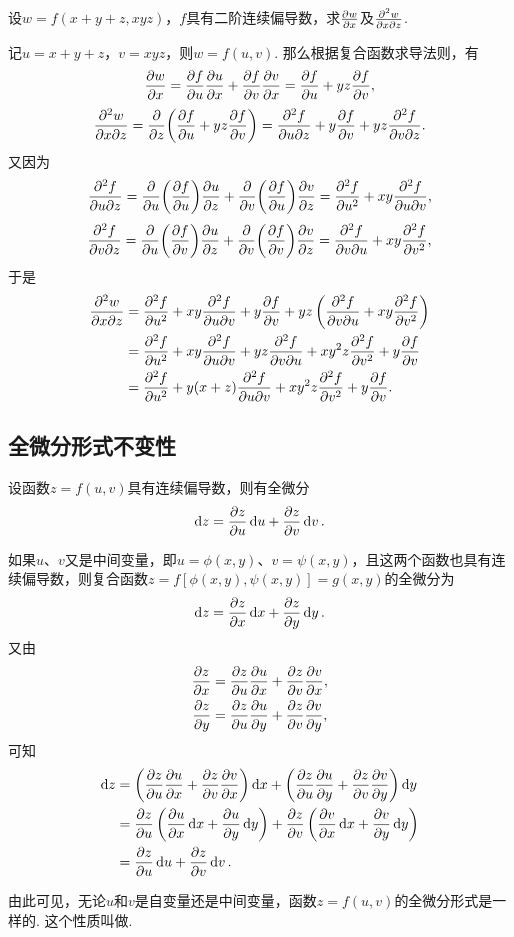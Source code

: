 \begin{example}
设\(w = f(x+y+z,xyz)\)，\(f\)具有二阶连续偏导数，求\(\pdv{w}{x}\)及\(\pdv[2]{w}{x}{z}\).
\begin{solution}
记\(u = x+y+z\)，\(v = xyz\)，则\(w = f(u,v)\).
那么根据复合函数求导法则，有\[
\pdv{w}{x} = \pdv{f}{u} \pdv{u}{x} + \pdv{f}{v} \pdv{v}{x}
= \pdv{f}{u} + yz \pdv{f}{v},
\]\[
\pdv[2]{w}{x}{z} = \pdv{z}(\pdv{f}{u} + yz \pdv{f}{v})
= \pdv[2]{f}{u}{z} + y\pdv{f}{v} + yz \pdv[2]{f}{v}{z}.
\]又因为\[
\pdv[2]{f}{u}{z}
= \pdv{u}(\pdv{f}{u}) \pdv{u}{z} + \pdv{v}(\pdv{f}{u}) \pdv{v}{z}
= \pdv[2]{f}{u} + xy \pdv[2]{f}{u}{v},
\]\[
\pdv[2]{f}{v}{z}
= \pdv{u}(\pdv{f}{v}) \pdv{u}{z} + \pdv{v}(\pdv{f}{v}) \pdv{v}{z}
= \pdv[2]{f}{v}{u} + xy \pdv[2]{f}{v},
\]于是\begin{align*}
\pdv[2]{w}{x}{z}
&= \pdv[2]{f}{u} + xy \pdv[2]{f}{u}{v}
 + y\pdv{f}{v} + yz \left( \pdv[2]{f}{v}{u} + xy \pdv[2]{f}{v} \right) \\
&= \pdv[2]{f}{u}
 + xy \pdv[2]{f}{u}{v} + yz \pdv[2]{f}{v}{u}
 + x y^2 z \pdv[2]{f}{v}
 + y \pdv{f}{v} \\
&= \pdv[2]{f}{u}
 + y(x+z) \pdv[2]{f}{u}{v}
 + x y^2 z \pdv[2]{f}{v}
 + y \pdv{f}{v}.
\end{align*}
\end{solution}
\end{example}

\subsection{全微分形式不变性}
\begin{theorem}[全微分形式不变性]
设函数\(z=f(u,v)\)具有连续偏导数，则有全微分\[
\dd{z}=\pdv{z}{u}\dd{u}+\pdv{z}{v}\dd{v}.
\]

如果\(u\)、\(v\)又是中间变量，即\(u=\phi(x,y)\)、\(v=\psi(x,y)\)，且这两个函数也具有连续偏导数，则复合函数\(z=f[\phi(x,y),\psi(x,y)]=g(x,y)\)的全微分为\[
\dd{z}=\pdv{z}{x}\dd{x}+\pdv{z}{y}\dd{y}.
\]又由\begin{gather*}
\pdv{z}{x} = \pdv{z}{u}\pdv{u}{x} + \pdv{z}{v}\pdv{v}{x}, \\
\pdv{z}{y} = \pdv{z}{u}\pdv{u}{y} + \pdv{z}{v}\pdv{v}{y},
\end{gather*}可知\begin{align*}
\dd{z}
&=\left(\pdv{z}{u}\pdv{u}{x} + \pdv{z}{v}\pdv{v}{x}\right)\dd{x}
+\left(\pdv{z}{u}\pdv{u}{y} + \pdv{z}{v}\pdv{v}{y}\right)\dd{y} \\
&=\pdv{z}{u}\left(\pdv{u}{x}\dd{x}+\pdv{u}{y}\dd{y}\right)
+\pdv{z}{v}\left(\pdv{v}{x}\dd{x}+\pdv{v}{y}\dd{y}\right) \\
&=\pdv{z}{u}\dd{u}+\pdv{z}{v}\dd{v}.
\end{align*}
\end{theorem}
由此可见，无论\(u\)和\(v\)是自变量还是中间变量，函数\(z=f(u,v)\)的全微分形式是一样的.
这个性质叫做.

